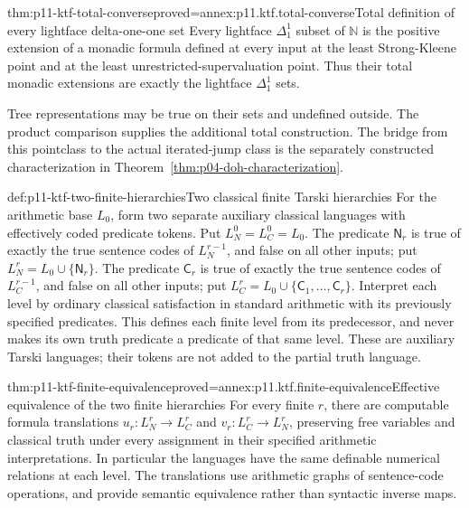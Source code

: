\begin{hbtheorem}{thm:p11-ktf-total-converse}{proved=annex:p11.ktf.total-converse}{Total definition of every lightface delta-one-one set}
Every lightface \(\Delta^1_1\) subset of \(\mathbb N\) is the
positive extension of a monadic formula defined at every input at the
least Strong-Kleene point and at the least unrestricted-supervaluation
point. Thus their total monadic extensions are exactly the lightface
\(\Delta^1_1\) sets.
\end{hbtheorem}

Tree representations may be true on their sets and undefined outside.
The product comparison supplies the additional total construction.
The bridge from this pointclass to the actual iterated-jump class is
the separately constructed characterization in
Theorem~\ref{thm:p04-doh-characterization}.

\begin{hbdefinition}{def:p11-ktf-two-finite-hierarchies}{Two classical finite Tarski hierarchies}
For the arithmetic base \(L_0\), form two separate auxiliary classical
languages with effectively coded predicate tokens. Put
\(L_N^0=L_C^0=L_0\). The predicate \(\mathsf N_r\) is true of
exactly the true sentence codes of \(L_N^{r-1}\), and false on all
other inputs; put \(L_N^r=L_0\cup\{\mathsf N_r\}\).
The predicate \(\mathsf C_r\) is true of exactly the true sentence
codes of \(L_C^{r-1}\), and false on all other inputs; put
\(L_C^r=L_0\cup\{\mathsf C_1,\ldots,\mathsf C_r\}\).
Interpret each level by ordinary classical satisfaction in standard
arithmetic with its previously specified predicates. This defines each
finite level from its predecessor, and never makes its own truth
predicate a predicate of that same level. These are auxiliary Tarski
languages; their tokens are not added to the partial truth language.
\end{hbdefinition}

\begin{hbtheorem}{thm:p11-ktf-finite-equivalence}{proved=annex:p11.ktf.finite-equivalence}{Effective equivalence of the two finite hierarchies}
For every finite \(r\), there are computable formula translations
\(u_r:L_N^r\to L_C^r\) and \(v_r:L_C^r\to L_N^r\),
preserving free variables and classical truth under every assignment
in their specified arithmetic interpretations. In particular the
languages have the same definable numerical relations at each level.
The translations use arithmetic graphs of sentence-code operations,
and provide semantic equivalence rather than syntactic inverse maps.
\end{hbtheorem}

